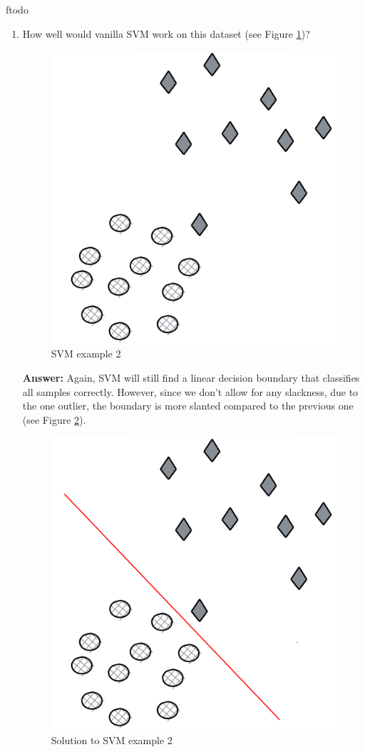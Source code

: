 ƒtodo\documentclass{article}
\newenvironment{QandA}{\begin{enumerate}[label=\arabic*.]}{\end{enumerate}}
\newenvironment{InnerQandA}{\begin{enumerate}[label=\roman*.]}{\end{enumerate}}
\newenvironment{answer}{\par\normalfont \textbf{Answer:}}{}
\begin{document}
\begin{QandA}
\begin{InnerQandA}
        \item How well would vanilla SVM work on this dataset (see Figure \ref{fig:svm-example-2})?
        \begin{figure}[htb!]
            \centering
            \includegraphics[width=0.3\columnwidth]{img/svm-example-2.png}
            \caption{SVM example 2}
            \label{fig:svm-example-2}
        \end{figure}
        \begin{answer}
            Again, SVM will still find a linear decision boundary that classifies all samples correctly. However, since we don't allow for any slackness, due to the one outlier, the boundary is more slanted compared to the previous one (see Figure \ref{fig:-sol-svm-example-2}). 
            \begin{figure}[htb!]
                \centering
                \includegraphics[width=0.3\columnwidth]{img/sol-svm-example-2.png}
                \caption{Solution to SVM example 2}
                \label{fig:-sol-svm-example-2}
            \end{figure}
        \end{answer}


\end{InnerQandA}
\end{QandA}
\end{document}
